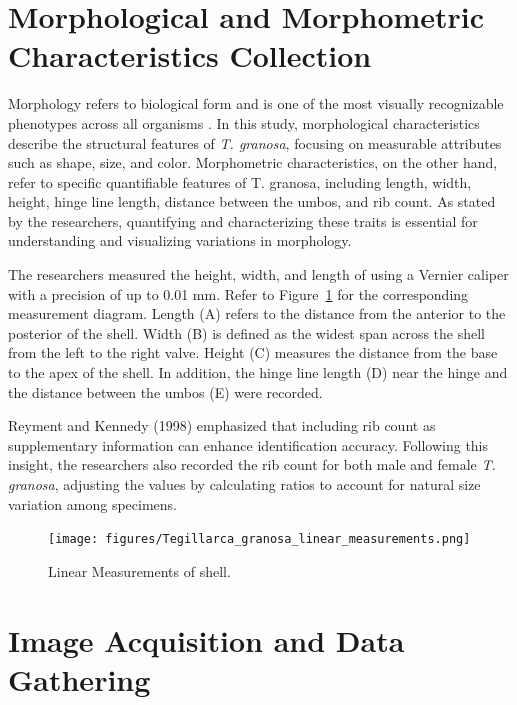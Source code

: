 \newpage
\section{Morphological and Morphometric Characteristics Collection}
\label{sec:morphochar}

Morphology refers to biological form and is one of the most visually recognizable phenotypes across all organisms \cite{tsutsumi2023}. In this study, morphological characteristics describe the structural features of \textit{T. granosa}, focusing on measurable attributes such as shape, size, and color. Morphometric characteristics, on the other hand, refer to specific quantifiable features of T. granosa, including length, width, height, hinge line length, distance between the umbos, and rib count. As stated by the researchers, quantifying and characterizing these traits is essential for understanding and visualizing variations in \Tgranosa morphology.

The researchers measured the height, width, and length of \Tgranosa using a Vernier caliper with a precision of up to 0.01 mm. Refer to Figure~\ref{fig:linear_measurements} for the corresponding measurement diagram. Length (A) refers to the distance from the anterior to the posterior of the shell. Width (B) is defined as the widest span across the shell from the left to the right valve. Height (C) measures the distance from the base to the apex of the shell. In addition, the hinge line length (D) near the hinge and the distance between the umbos (E) were recorded.

Reyment and Kennedy (1998) emphasized that including rib count as supplementary information can enhance identification accuracy. Following this insight, the researchers also recorded the rib count for both male and female \textit{T. granosa}, adjusting the values by calculating ratios to account for natural size variation among specimens.

\begin{figure}[!htbp]
	\centering
	\texttt{[image: figures/Tegillarca\_granosa\_linear\_measurements.png]}
	\caption{Linear Measurements of  \Tegillarcagranosa shell.}
	\label{fig:linear_measurements}
\end{figure}

\section{Image Acquisition and Data Gathering}
\label{sec:imageprocess}

